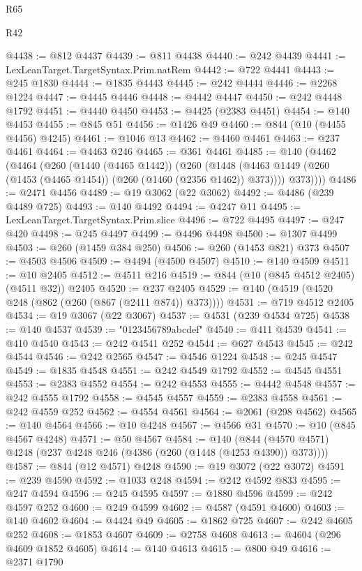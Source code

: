 \begin{lexlean}{R65}
\begin{lexlean}{R42}
\begin{coremodule}
{{{{{{{{{{{{{{{{{{{{{{{{{{{{{{{{{{{{{{{{{{{{{{{{{{{{{{{{{{{{{{{{{{{{{{{{{{{{{{{{{{{{{{{{{{{{{{{{{{{{{{{{{{{{{{{{{{{{{{{{{{{{{{{{{{{{{{{{{{{{{{{{{{{{{{{{{{{{{{{{{{{{{{{{{{{{{{{{{{{{{{{{@4438 := @812 @4437
@4439 := @811 @4438
@4440 := @242 @4439
@4441 := LexLeanTarget.TargetSyntax.Prim.natRem
@4442 := @722 @4441
@4443 := @245 @1830
@4444 := @1835 @4443
@4445 := @242 @4444
@4446 := @2268 @1224
@4447 := @4445 @4446
@4448 := @4442 @4447
@4450 := @242 @4448 @1792
@4451 := @4440 @4450
@4453 := @4425 (@2383 @4451)
@4454 := @140 @4453
@4455 := @845 @51
@4456 := @1426 @49
@4460 := @844 (@10 (@4455 @4456) @4245)
@4461 := @1046 @13
@4462 := @4460 @4461
@4463 := @237 @4461
@4464 := @4463 @246
@4465 := @361 @4461
@4485 := @140
    (@4462
      (@4464
        (@260
          (@1440 (@4465 @1442))
          (@260
            (@1448 (@4463 @1449 (@260 (@1453 (@4465 @1454)) (@260 (@1460 (@2356 @1462)) @373))))
            @373))))
@4486 := @2471 @4456
@4489 := @19 @3062 (@22 @3062)
@4492 := @4486 (@239 @4489 @725)
@4493 := @140 @4492
@4494 := @4247 @11
@4495 := LexLeanTarget.TargetSyntax.Prim.slice
@4496 := @722 @4495
@4497 := @247 @420
@4498 := @245 @4497
@4499 := @4496 @4498
@4500 := @1307 @4499
@4503 := @260 (@1459 @384 @250)
@4506 := @260 (@1453 @821) @373
@4507 := @4503 @4506
@4509 := @4494 (@4500 @4507)
@4510 := @140 @4509
@4511 := @10 @2405
@4512 := @4511 @216
@4519 := @844 (@10 (@845 @4512 @2405) (@4511 @32)) @2405
@4520 := @237 @2405
@4529 := @140 (@4519 (@4520 @248 (@862 (@260 (@867 (@2411 @874)) @373))))
@4531 := @719 @4512 @2405
@4534 := @19 @3067 (@22 @3067)
@4537 := @4531 (@239 @4534 @725)
@4538 := @140 @4537
@4539 := "0123456789abcdef"
@4540 := @411 @4539
@4541 := @410 @4540
@4543 := @242 @4541 @252
@4544 := @627 @4543
@4545 := @242 @4544
@4546 := @242 @2565
@4547 := @4546 @1224
@4548 := @245 @4547
@4549 := @1835 @4548
@4551 := @242 @4549 @1792
@4552 := @4545 @4551
@4553 := @2383 @4552
@4554 := @242 @4553
@4555 := @4442 @4548
@4557 := @242 @4555 @1792
@4558 := @4545 @4557
@4559 := @2383 @4558
@4561 := @242 @4559 @252
@4562 := @4554 @4561
@4564 := @2061 (@298 @4562)
@4565 := @140 @4564
@4566 := @10 @4248
@4567 := @4566 @31
@4570 := @10 (@845 @4567 @4248)
@4571 := @50 @4567
@4584 := @140 (@844 (@4570 @4571) @4248 (@237 @4248 @246 (@4386 (@260 (@1448 (@4253 @4390)) @373))))
@4587 := @844 (@12 @4571) @4248
@4590 := @19 @3072 (@22 @3072)
@4591 := @239 @4590
@4592 := @1033 @248
@4594 := @242 @4592 @833
@4595 := @247 @4594
@4596 := @245 @4595
@4597 := @1880 @4596
@4599 := @242 @4597 @252
@4600 := @249 @4599
@4602 := @4587 (@4591 @4600)
@4603 := @140 @4602
@4604 := @4424 @49
@4605 := @1862 @725
@4607 := @242 @4605 @252
@4608 := @1853 @4607
@4609 := @2758 @4608
@4613 := @4604 (@296 @4609 @1852 @4605)
@4614 := @140 @4613
@4615 := @800 @49
@4616 := @2371 @1790
}}}}}}}}}}}}}}}}}}}}}}}}}}}}}}}}}}}}}}}}}}}}}}}}}}}}}}}}}}}}}}}}}}}}}}}}}}}}}}}}}}}}}}}}}}}}}}}}}}}}}}}}}}}}}}}}}}}}}}}}}}}}}}}}}}}}}}}}}}}}}}}}}}}}}}}}}}}}}}}}}}}}}}}}}}}}}}}}}}}}}}}}
\end{coremodule}
\end{lexlean}
\end{lexlean}
